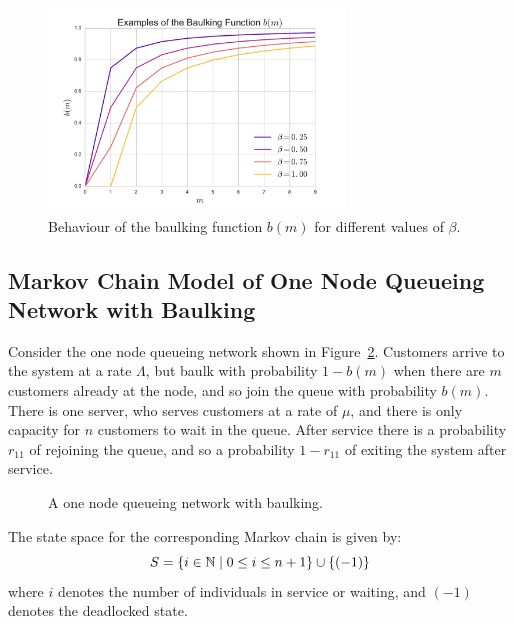 \documentclass{article}
\begin{document}
\begin{figure}[!hbtp]
    \begin{center}
        \includegraphics[width=0.7\textwidth]{img/examplebaulking.pdf}
    \end{center}
    \caption{Behaviour of the baulking function $b(m)$ for different values of $\beta$.}
    \label{fig:examplebaulkingfunctions}
\end{figure}


\subsection{Markov Chain Model of One Node Queueing Network with Baulking}

Consider the one node queueing network shown in Figure~\ref{fig:onenodenetwork_baulking}.
Customers arrive to the system at a rate $\Lambda$, but baulk with probability $1 - b(m)$ when there are $m$ customers already at the node, and so join the queue with probability $b(m)$.
There is one server, who serves customers at a rate of $\mu$, and there is only capacity for $n$ customers to wait in the queue.
After service there is a probability $r_{11}$ of rejoining the queue, and so a probability $1-r_{11}$ of exiting the system after service.

\begin{figure}[!hbtp]
    \begin{center}
        
    \end{center}
    \caption{A one node queueing network with baulking.}
    \label{fig:onenodenetwork_baulking}
\end{figure}

The state space for the corresponding Markov chain is given by:
        \[S = \{i\in\mathbb{N} \nonscript\; | \nonscript\; 0 \leq i \leq n + 1
        \}\cup\{(-1)\}\]
where \(i\) denotes the number of individuals in service or waiting, and $(-1)$ denotes the deadlocked state.
\end{document}
